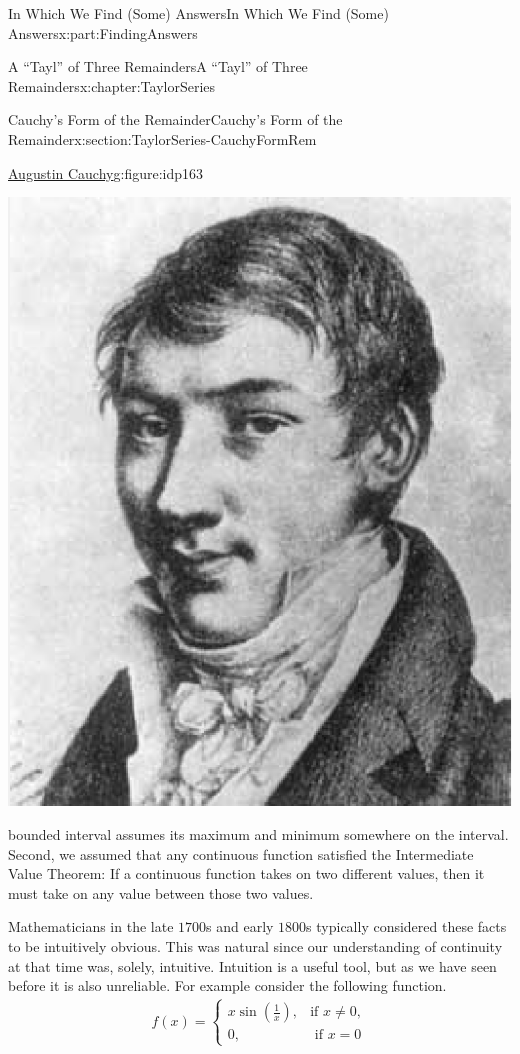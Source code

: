 \documentclass[oneside,10pt,]{book}
\numberwithin{equation}{section}
\newcommand{\amp}{&}
\begin{document}
\begin{partptx}{In Which We Find (Some) Answers}{}{In Which We Find (Some) Answers}{}{}{x:part:FindingAnswers}
\begin{chapterptx}{A ``Tayl'' of Three Remainders}{}{A ``Tayl'' of Three Remainders}{}{}{x:chapter:TaylorSeries}
\begin{sectionptx}{Cauchy's Form of the Remainder}{}{Cauchy's Form of the Remainder}{}{}{x:section:TaylorSeries-CauchyFormRem}
\begin{figureptx}{\href{https://mathshistory.st-andrews.ac.uk/Biographies/Cauchy/}{Augustin Cauchy}\protect\footnotemark{}}{g:figure:idp163}{}
\begin{image}{0.36}{0.28}{0.36}
\includegraphics[width=\linewidth]{images/Cauchy.png}
\end{image}%
\tcblower
\end{figureptx}%
%
bounded interval assumes its maximum and minimum somewhere on the interval. Second, we assumed that any continuous function satisfied the Intermediate Value Theorem: If a continuous function takes on two different values, then it must take on any value between those two values.%
\par
Mathematicians in the late \(1700\)s and early \(1800\)s typically considered these facts to be intuitively obvious.  This was natural since our understanding of continuity at that time was, solely, intuitive.  Intuition is a useful tool, but as we have seen before it is also unreliable.  For example consider the following function.%
\begin{align}
f(x)= 
\begin{cases}
x\sin\left(\frac{1}{x}\right),\amp \text{if } x\neq 0,\\
0, \amp \text{ if } x=0 

\end{cases}
\end{align}
\end{sectionptx}
\end{chapterptx}
\end{partptx}
\end{document}
